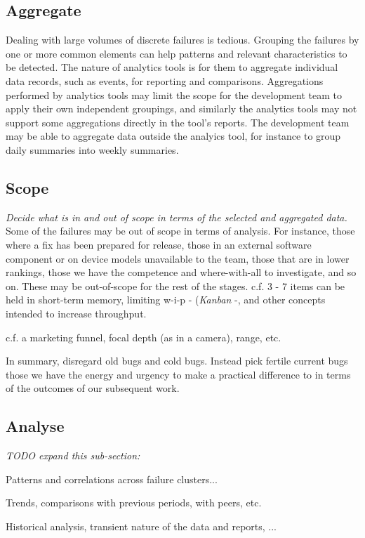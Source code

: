 \subsection{Aggregate}
Dealing with large volumes of discrete failures is tedious. Grouping the failures by one or more common elements can help patterns and relevant characteristics to be detected. The nature of analytics tools is for them to aggregate individual data records, such as events, for reporting and comparisons. Aggregations performed by analytics tools may limit the scope for the development team to apply their own independent groupings, and similarly the analytics tools may not support some aggregations directly in the tool's reports. The development team may be able to aggregate data outside the analyics tool, for instance to group daily summaries into weekly summaries. 

\subsection{Scope}
\emph{Decide what is in and out of scope in terms of the selected and aggregated data.} Some of the failures may be out of scope in terms of analysis. For instance, those where a fix has been prepared for release, those in an external software component or on device models unavailable to the team, those that are in lower rankings, those we have the competence and where-with-all to investigate, and so on. These may be out-of-scope for the rest of the stages. c.f. 3 - 7 items can be held in short-term memory, limiting w-i-p - (\emph{Kanban} -, and other concepts intended to increase throughput.

c.f. a marketing funnel, focal depth (as in a camera), range, etc. 

In summary, disregard old bugs and cold bugs. Instead pick fertile current bugs those we have the energy and urgency to make a practical difference to in terms of the outcomes of our subsequent work.


\subsection{Analyse}
\textit{TODO expand this sub-section:}

Patterns and correlations across failure clusters... 

Trends, comparisons with previous periods, with peers, etc.

Historical analysis, transient nature of the data and reports, ...

